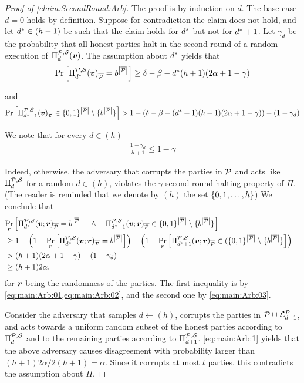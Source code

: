 \begin{proof}[Proof of \cref{claim:SecondRound:Arb}]
The proof is by induction on $d$. The base case $d=0$ holds by definition. Suppose for contradiction the claim does not hold, and let ${d^\ast}\in(h-1)$
be such that the claim holds for ${d^\ast}$ but not for ${d^\ast}+1$. Let $\gamma_d$ be the probability that all honest parties halt in the second round of a random execution of $\Pi^{\mathcal{P},\mathcal{S}}_d({ \boldsymbol{v}})$. The assumption about ${d^\ast}$ yields that
\begin{align}\label{eq:main:Arb:01}
\Pr_{}\left[\Pi^{\mathcal{P},\mathcal{S}}_{d^\ast}({ \boldsymbol{v}})_{\overline{\mathcal{P}}} = b^{\left|{\overline{\mathcal{P}}}\right|}\right] \ge \delta- \beta- {d^\ast} (h+1)(2\alpha + 1-\gamma)
\end{align}

and
\begin{align}\label{eq:main:Arb:02}
\Pr_{}\left[\Pi^{\mathcal{P},\mathcal{S}}_{{d^\ast}+1}({ \boldsymbol{v}})_{\overline{\mathcal{P}}} \in \{0,1\}^{\left|{\overline{\mathcal{P}}}\right|} \setminus \{b^{\left|{\overline{\mathcal{P}}}\right|}\}\right] > 1-\left(\delta - \beta - ({d^\ast}+1) (h+1)(2\alpha + 1-\gamma)\right)- (1-\gamma_d)
\end{align}


We note that for every $d\in (h)$
\begin{align}\label{eq:main:Arb:03}
\frac{1- \gamma_d}{h+1} \le 1-\gamma
\end{align}


Indeed, otherwise, the adversary that corrupts the parties in $\mathcal{P}$ and acts like $\Pi^{\mathcal{P},\mathcal{S}}_d$ for a random $d\in (h)$, violates the $\gamma$-second-round-halting property of $\Pi$. (The reader is reminded that we denote by $(h)$ the set $\{0,1,\ldots,h\}$) We conclude that
\begin{align}\label{eq:main:Arb:1}
\lefteqn{\ppr{\vr}{\PP_\ds(\vv;\vr)_\oP = \o^{\size{\oP}} \qand \PP_{\ds+1}(\vv;\vr)_\oP \in \zo^{\size{\oP}} \setminus \sset{\o^{\size{\oP}}}}}\\
& \ge 1 - \left(1- \ppr{\vr}{\PP_\ds(\vv;\vr)_\oP = \o^{\size{\oP}}} \right) - \left(1- \ppr{\vr}{\PP_{\ds+1}(\vv;\vr)_\oP \in (\zo^{\size{\oP}} \setminus \sset{\o^{\size{\oP}}}}\right)\nonumber\\
& > (h+1) (2\alpha + 1 - \gamma) - (1-\gamma_d) \nonumber\\
& \ge (h+1) 2\alpha.\nonumber
\end{align}
for ${ \boldsymbol{r}}$ being the randomness of the parties. The first inequality is by \cref{eq:main:Arb:01,eq:main:Arb:02}, and the second one by \cref{eq:main:Arb:03}.

Consider the adversary that samples $d\gets (h)$, corrupts the parties in $\mathcal{P} \cup {\cal{L}}^{\mathcal{P}}_{d+1}$, and acts towards a uniform random subset of the honest parties according to $\Pi^{\mathcal{P},\mathcal{S}}_d$ and to the remaining parties according to $\Pi^{\mathcal{P},\mathcal{S}}_{d+1}$. \cref{eq:main:Arb:1} yields that the above adversary causes disagreement with probability larger than $(h+1) 2\alpha/2(h+1) = \alpha$. Since it corrupts at most $t$ parties, this contradicts the assumption about $\Pi$.
\end{proof}





